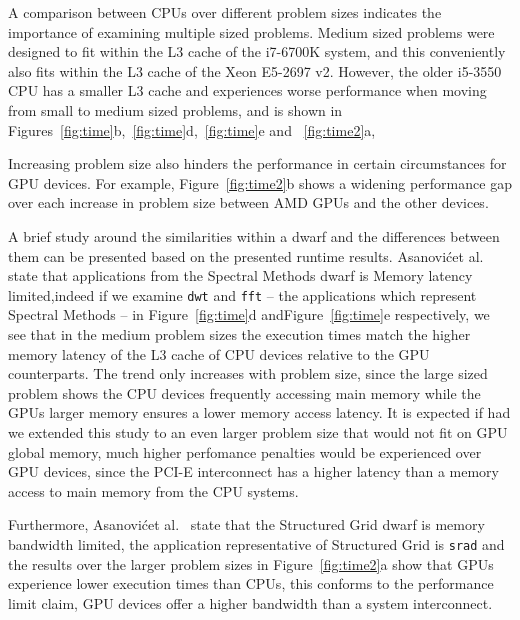 \documentclass[../document.tex]{subfiles}
\begin{document}
A comparison between CPUs over different problem sizes indicates the importance of examining multiple sized problems.
Medium sized problems were designed to fit within the L3 cache of the i7-6700K system, and this conveniently also fits within the L3 cache of the Xeon E5-2697 v2.
However, the older i5-3550 CPU has a smaller L3 cache and experiences worse performance when moving from small to medium sized problems, and is shown in Figures~\ref{fig:time}b,~\ref{fig:time}d,~\ref{fig:time}e and ~\ref{fig:time2}a,

Increasing problem size also hinders the performance in certain circumstances for GPU devices.
For example, Figure~\ref{fig:time2}b shows a widening performance gap over each increase in problem size between AMD GPUs and the other devices.

A brief study around the similarities within a dwarf and the differences between them can be presented based on the presented runtime results.
Asanovi\'{c}et al.~\cite{asanovic2006landscape} state that applications from the Spectral Methods dwarf is Memory latency limited,indeed if we examine {\tt dwt} and {\tt fft} -- the applications which represent Spectral Methods -- in Figure~\ref{fig:time}d andFigure~\ref{fig:time}e respectively, we see that in the medium problem sizes the execution times match the higher memory latency of the L3 cache of CPU devices relative to the GPU counterparts.
The trend only increases with problem size, since the large sized problem shows the CPU devices frequently accessing main memory while the GPUs larger memory ensures a lower memory access latency.
It is expected if had we extended this study to an even larger problem size that would not fit on GPU global memory, much higher perfomance penalties would be experienced over GPU devices, since the PCI-E interconnect has a higher latency than a memory access to main memory from the CPU systems.

Furthermore, Asanovi\'{c}et al.~\cite{asanovic2006landscape} state that the Structured Grid dwarf is memory bandwidth limited, the application representative of Structured Grid is {\tt srad} and the results over the larger problem sizes in Figure~\ref{fig:time2}a show that GPUs experience lower execution times than CPUs, this conforms to the performance limit claim, GPU devices offer a higher bandwidth than a system interconnect.

\end{document}
